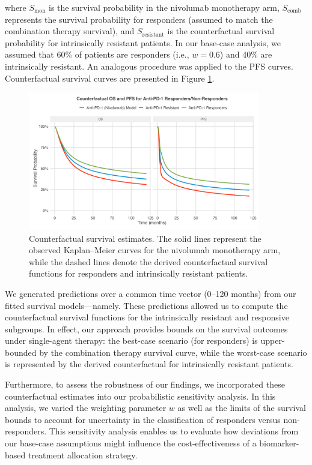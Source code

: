 \documentclass[preprint, 3p,
authoryear]{elsarticle} %
\begin{document}
where \(S_{\text{mon}}\) is the survival probability in the nivolumab
monotherapy arm, \(S_{\text{comb}}\) represents the survival probability
for responders (assumed to match the combination therapy survival), and
\(S_{\text{resistant}}\) is the counterfactual survival probability for
intrinsically resistant patients. In our base-case analysis, we assumed
that 60\% of patients are responders (i.e., \(w = 0.6\)) and 40\% are
intrinsically resistant. An analogous procedure was applied to the PFS
curves. Counterfactual survival curves are presented in Figure
\hyperref[fig:counterfactual]{\ref{fig:counterfactual}}.

\begin{figure}[h]
\centering
\includegraphics[width=0.9\textwidth]{../outputs/counterfactual_survival.png}
\caption{Counterfactual survival estimates. The solid lines represent the observed Kaplan–Meier curves for the nivolumab monotherapy arm, while the dashed lines denote the derived counterfactual survival functions for responders and intrinsically resistant patients.}
\label{fig:counterfactual}
\end{figure}

We generated predictions over a common time vector (0--120 months) from
our fitted survival models---namely. These predictions allowed us to
compute the counterfactual survival functions for the intrinsically
resistant and responsive subgroups. In effect, our approach provides
bounds on the survival outcomes under single-agent therapy: the
best-case scenario (for responders) is upper-bounded by the combination
therapy survival curve, while the worst-case scenario is represented by
the derived counterfactual for intrinsically resistant patients.

Furthermore, to assess the robustness of our findings, we incorporated
these counterfactual estimates into our probabilistic sensitivity
analysis. In this analysis, we varied the weighting parameter \(w\) as
well as the limits of the survival bounds to account for uncertainty in
the classification of responders versus non-responders. This sensitivity
analysis enables us to evaluate how deviations from our base-case
assumptions might influence the cost-effectiveness of a biomarker-based
treatment allocation strategy.
\end{document}
